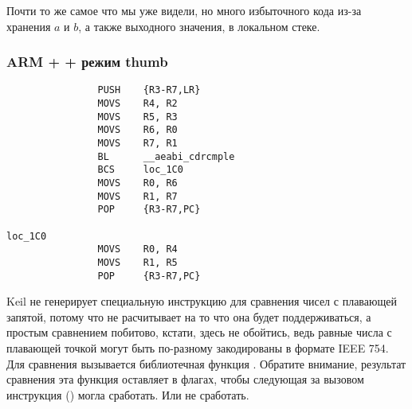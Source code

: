 Почти то же самое что мы уже видели, но много избыточного кода из-за хранения $a$ и $b$, а также 
выходного значения, в локальном стеке.

\subsubsection{ARM + \OptimizingKeil + режим thumb}

\begin{lstlisting}
                PUSH    {R3-R7,LR}
                MOVS    R4, R2
                MOVS    R5, R3
                MOVS    R6, R0
                MOVS    R7, R1
                BL      __aeabi_cdrcmple
                BCS     loc_1C0
                MOVS    R0, R6
                MOVS    R1, R7
                POP     {R3-R7,PC}

loc_1C0
                MOVS    R0, R4
                MOVS    R1, R5
                POP     {R3-R7,PC}
\end{lstlisting}

Keil не генерирует специальную инструкцию для сравнения чисел с плавающей запятой, потому что не 
расчитывает на то что она будет поддерживаться, а простым сравнением побитово, кстати, здесь не обойтись,
ведь равные числа с плавающей точкой могут быть по-разному закодированы в формате IEEE 754. 
Для сравнения вызывается библиотечная функция . Обратите внимание, результат
сравнения эта функция оставляет в флагах, чтобы следующая за вызовом инструкция  () могла сработать. Или не сработать.

 
